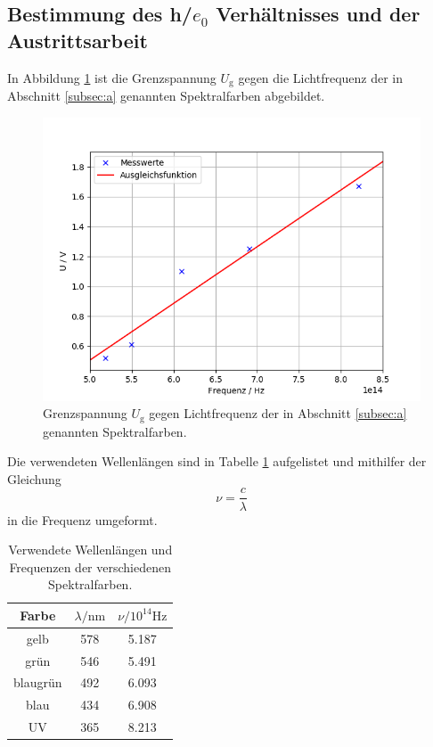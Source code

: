 \subsection{Bestimmung des h/$e_0$ Verhältnisses und der Austrittsarbeit}
In Abbildung \ref{fig:bPlot} ist die Grenzspannung $U_\text{g}$ gegen die Lichtfrequenz \nu der in Abschnitt \ref{subsec:a} genannten Spektralfarben abgebildet.

\begin{figure}[H]
    \centering
    \includegraphics[scale=0.7]{Auswertung/bPlot.png}
    \caption{Grenzspannung $U_\text{g}$ gegen Lichtfrequenz \nu der in Abschnitt \ref{subsec:a} genannten Spektralfarben.}
    \label{fig:bPlot}
\end{figure}

Die verwendeten Wellenlängen sind in Tabelle \ref{tab:Längen} aufgelistet und mithilfer der Gleichung
\begin{equation*}
	\nu = \frac{c}{\lambda}
\end{equation*}
in die Frequenz \nu umgeformt.

\begin{table} [H]
	\centering
	\caption{Verwendete Wellenlängen und Frequenzen der verschiedenen Spektralfarben.}
	\label{tab:Längen}
	\begin{tabular}{c|cc}
		\toprule
		{Farbe}&{$\lambda / \text{nm}$}&{$\nu / 10^{14} \text{Hz}$} \\
		\midrule
		gelb&578&5.187\\
		grün&546&5.491\\
		blaugrün&492&6.093\\
		blau&434&6.908\\
		UV&365&8.213\\
		\bottomrule 
	\end{tabular}
\end{table} 

